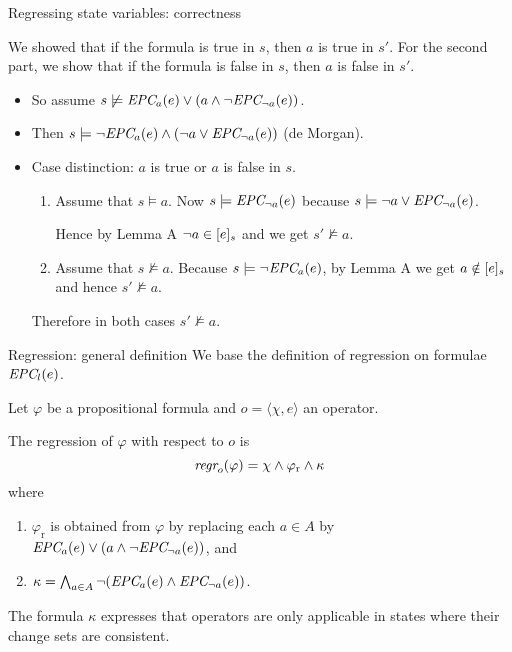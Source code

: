 \documentclass{gkibeamer}
\begin{document}
\begin{frame}{Regressing state variables: correctness}
  \begin{proofend}
    \hilite{$(\Leftarrow)$:} We showed that if the formula is
    \alert{true} in $s$, then $a$ is \alert{true} in $s'$.
    For the second part, we show that if the formula is \alert{false}
    in $s$, then $a$ is \alert{false} in $s'$. \pause

    \begin{itemize}
    \item So assume
      $s \not\models \textit{EPC}_{a}(e) \lor (a \land \neg \textit{EPC}_{\neg
      a}(e))$. \pause
    \item Then $s \models \neg \textit{EPC}_{a}(e) \land (\neg a \lor
      \textit{EPC}_{\neg a}(e))$ (de Morgan). \pause
    \item Case distinction: $a$ is true or $a$ is false in $s$.
      \pause
      \begin{enumerate}
      \item Assume that $s \models a$.
        Now $s \models \textit{EPC}_{\neg a}(e)$ because $s \models \neg a
        \lor \textit{EPC}_{\neg a}(e)$.

        Hence by Lemma A $\neg a \in \lbrack e\rbrack_{s}$ and we get $s'
        \not\models a$. \pause
      \item Assume that $s\not\models a$.
        Because $s \models \neg \textit{EPC}_{a}(e)$, by Lemma A
        we get $a \notin \lbrack e\rbrack_{s}$ and hence $s' \not\models a$.
      \end{enumerate}
      \pause
      Therefore in both cases $s' \not\models a$.
    \end{itemize}
  \end{proofend}
\end{frame}

\begin{frame}{Regression: general definition}
  We base the definition of regression on formulae $\textit{EPC}_{l}(e)$.

  \begin{definition}
    Let $\varphi$ be a propositional formula and $o = \langle \chi,
    e\rangle$ an operator.

    The \alert{regression of $\varphi$ with respect to $o$} is
    \[ \textit{regr}_{o}(\varphi) = \chi \land \varphi_{\text{r}} \land \kappa \]
    where
    \begin{enumerate}
    \item $\varphi_{\text{r}}$ is obtained from $\varphi$ by replacing
      each $a \in A$ by $\textit{EPC}_{a}(e) \lor
      (a \land \neg \textit{EPC}_{\neg a}(e))$, and
    \item $\kappa = \bigwedge_{a \in A} \neg (\textit{EPC}_{a}(e) \land 
      \textit{EPC}_{\neg a}(e))$.
    \end{enumerate}
  \end{definition}

  The formula $\kappa$ expresses that operators are only applicable in
  states where their change sets are consistent.
\end{frame}
\end{document}
